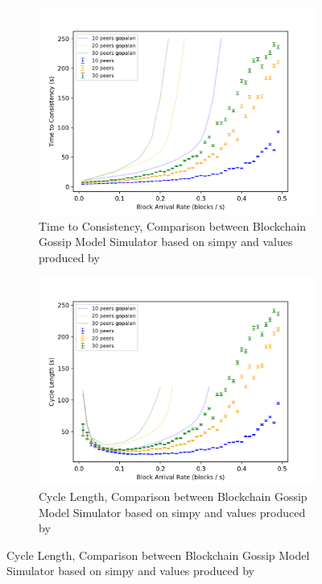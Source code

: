 \begin{figure}[h]
	\begin{subfigure}[b]{0.48\textwidth}
		\includegraphics[width=\textwidth]{figures/gopalan_figures/time_to_consistency.png}
		\caption{ Time to Consistency, Comparison between Blockchain Gossip Model Simulator based on simpy and values produced by \gopalan}
		\label{fig:gopalan_ttc}
	\end{subfigure}
	\hfill
	\begin{subfigure}[b]{0.48\textwidth}
		\includegraphics[width=\textwidth]{figures/gopalan_figures/cycle_length_avg.png}
		\caption{ Cycle Length, Comparison between Blockchain Gossip Model Simulator based on simpy and values produced by \gopalan}
		\label{fig:gopalan_cl}

\end{subfigure}
\end{figure}
